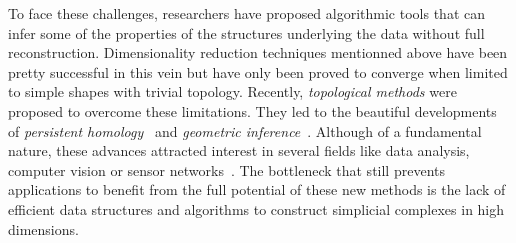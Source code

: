 To face these challenges, researchers have proposed algorithmic tools that can infer some of the properties of the structures underlying the data without full reconstruction. Dimensionality reduction techniques mentionned above have been pretty successful in this vein %
but have only been proved to converge when limited to simple shapes with trivial topology.  Recently, {\em topological methods} were proposed to overcome these limitations. They led to the beautiful developments of {\em persistent homology}~\cite{eh-ph-2008} and {\em geometric inference}~\cite{geometrica-ccl09}. Although of a fundamental nature, these advances attracted interest in several fields like data analysis, computer vision or sensor networks~\cite{rg-bptd-2008}. The bottleneck that still prevents applications to benefit from the full potential of these new methods is the lack of efficient data structures and algorithms to construct simplicial complexes in high dimensions.



